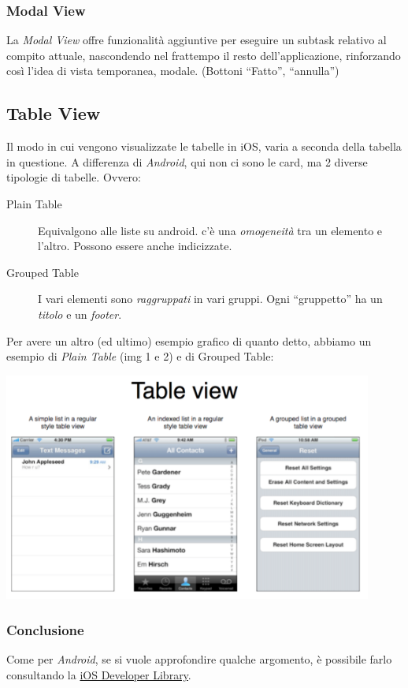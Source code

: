 \documentclass[oneside]{book}
\begin{document}
			\subsubsection{Modal View}
				La \emph{Modal View} offre funzionalità aggiuntive per eseguire un subtask relativo al compito attuale, nascondendo nel frattempo il resto dell'applicazione, rinforzando così l’idea di vista temporanea, modale. (Bottoni ``Fatto'', ``annulla'')

		\subsection{Table View} \label{sez:TableView}
			Il modo in cui vengono visualizzate le tabelle in iOS, varia a seconda della tabella in questione. A differenza di \emph{Android}, qui non ci sono le card, ma 2 diverse tipologie di tabelle. Ovvero:
			\begin{description}
			\item[Plain Table] Equivalgono alle liste su android. c'è una \emph{omogeneità} tra un elemento e l'altro. Possono essere anche indicizzate.
			\item[Grouped Table] I vari elementi sono \emph{raggruppati} in vari gruppi. Ogni ``gruppetto'' ha un \emph{titolo} e un \emph{footer}.
			\end{description}
			Per avere un altro (ed ultimo) esempio grafico di quanto detto, abbiamo un esempio di \emph{Plain Table} (img 1 e 2) e di {Grouped Table}:
			\begin{center}
			\includegraphics[height = 75mm]{images/tableview.png}
			\end{center}
			\subsubsection{Conclusione}
			Come per \emph{Android}, se si vuole approfondire qualche argomento, è possibile farlo consultando la \href{https://developer.apple.com/library/ios/navigation/}{iOS Developer Library}.
		
\end{document}

